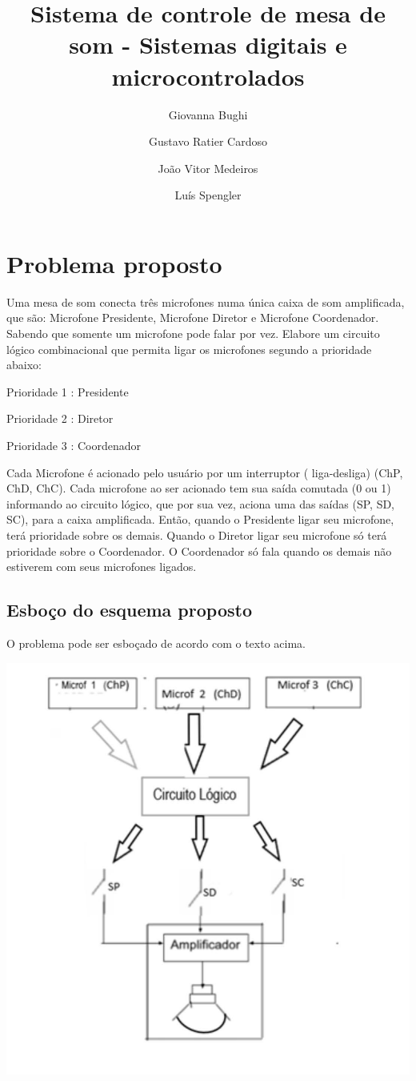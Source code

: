 \documentclass{article}
\title{Sistema de controle de mesa de som - Sistemas digitais e microcontrolados}
\date{}
\author[1]{Giovanna Bughi}
\author[2]{Gustavo Ratier Cardoso}
\author[3]{João Vitor Medeiros}
\author[4]{Luís Spengler}
\affil[1,2,3,4]{Instituto Federal de Educação, Ciência e Tecnologia de Mato Grosso do Sul}
\begin{document}
\maketitle

\tableofcontents

\medskip

\section{Problema proposto}
Uma mesa de som conecta três microfones numa única caixa de som amplificada, que são: Microfone Presidente, Microfone Diretor e Microfone Coordenador. Sabendo que somente um microfone pode falar por vez. Elabore um circuito lógico combinacional que permita ligar os microfones segundo a prioridade abaixo:

Prioridade 1 : Presidente         

Prioridade 2 : Diretor

Prioridade 3 : Coordenador

Cada Microfone é acionado pelo usuário por um interruptor  ( liga-desliga) (ChP, ChD, ChC). Cada microfone  ao ser acionado tem sua saída  comutada (0 ou 1) informando ao circuito lógico,  que por sua vez, aciona uma das  saídas (SP, SD, SC), para a caixa amplificada. Então, quando o Presidente ligar seu microfone, terá prioridade sobre os demais. Quando o Diretor ligar seu microfone só terá prioridade sobre o  Coordenador. O Coordenador só fala quando os demais não estiverem com seus microfones ligados.

\subsection{Esboço do esquema proposto}
O problema pode ser esboçado de acordo com o texto acima.

\includegraphics[width=\textwidth]{esbocoroubado}
\end{document}

